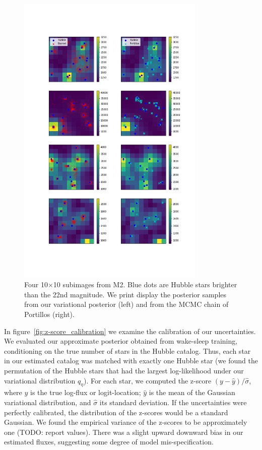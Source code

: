 \begin{figure}[h]
    \centering
    \vspace{-3cm}
    \includegraphics[width=0.8\textwidth]{figures/example_subimages_samples.png}
    \vspace{-3cm}
    \caption{Four 10$\times$10 subimages from
    M2. Blue dots are Hubble stars brighter than the 22nd magnitude.
    We print display the posterior samples from our variational
    posterior (left) and from the MCMC chain of Portillos (right). }
    \label{fig:example_subimages_sampled}
\end{figure}

In figure~\ref{fig:z-score_calibration} we examine the calibration of our uncertainties. We evaluated our approximate posterior obtained from wake-sleep training, conditioning on the true number of stars in the Hubble catalog. Thus, each star in our estimated 
catalog was matched with exactly one Hubble star (we found the permutation of the Hubble stars that had the largest log-likelihood under our variational distribution $q_\eta$). For each star, we computed the z-score $(y - \hat y) / \hat \sigma$, where $y$ is the true log-flux or 
logit-location; $\hat y$ is the mean of the Gaussian variational distribution, and $\hat\sigma$  its standard deviation. If the uncertainties were perfectly calibrated, the distribution of the 
z-scores would be a standard Gaussian. We found the empirical variance of the z-scores
to be approximately one (TODO: report values). There was a slight upward downward bias in our estimated fluxes, suggesting some degree of model mis-specification. 

